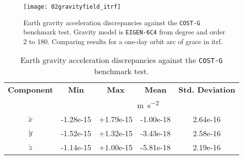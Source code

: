 \begin{figure}
  \centering
  \texttt{[image: 02gravityfield\_itrf]}
  \caption{Earth gravity acceleration discrepancies against the \texttt{COST-G} 
    benchmark test. Gravity model is \texttt{EIGEN-6C4} from degree and order 2 to 180. 
    Comparing results for a one-day orbit arc of \gls{grace} in \gls{itrf}.}
  \label{fig:costg-benchmark-02gravityfield-itrf}
\end{figure}

\begin{table}[]
  \centering
  \begin{tabular}{ccccc}
      \textbf{Component} & \textbf{Min} & \textbf{Max} & \textbf{Mean} & \textbf{Std. Deviation}\\
      & \multicolumn{4}{c}{\si{\metre\per\square\second}} \\
      \hline
      $\ddot{x}$ & -1.28e-15 & +1.79e-15 & -1.00e-18 & 2.64e-16 \\
      $\ddot{y}$ & -1.52e-15 & +1.32e-15 & -3.43e-18 & 2.58e-16 \\
      $\ddot{z}$ & -1.14e-15 & +1.00e-15 & -5.81e-18 & 2.19e-16 \\
      \hline
  \end{tabular}
  \caption{Earth gravity acceleration discrepancies against the \texttt{COST-G} benchmark test.}
  \label{table:costg-benchmark-02gravityfield-itrf}
\end{table}
